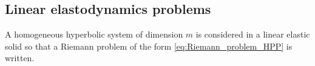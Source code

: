 \subsection{Linear elastodynamics problems}
\label{subsec:charac_Linear_problems}
A homogeneous hyperbolic system of dimension $m$ is considered in a linear elastic solid so that a Riemann problem of the form \eqref{eq:Riemann_problem_HPP} is written.%

